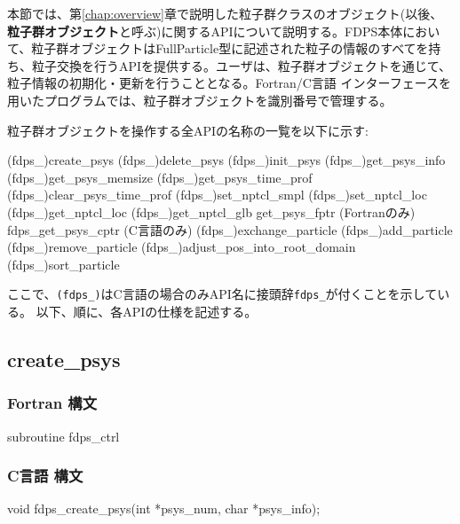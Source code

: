 本節では、第\ref{chap:overview}章で説明した粒子群クラスのオブジェクト(以後、\textbf{粒子群オブジェクト}と呼ぶ)に関するAPIについて説明する。FDPS本体において、粒子群オブジェクトはFullParticle型に記述された粒子の情報のすべてを持ち、粒子交換を行うAPIを提供する。ユーザは、粒子群オブジェクトを通じて、粒子情報の初期化・更新を行うこととなる。Fortran/C言語 インターフェースを用いたプログラムでは、粒子群オブジェクトを識別番号で管理する。

粒子群オブジェクトを操作する全APIの名称の一覧を以下に示す:
\begin{screen}
\begin{spverbatim}
(fdps_)create_psys
(fdps_)delete_psys
(fdps_)init_psys
(fdps_)get_psys_info
(fdps_)get_psys_memsize
(fdps_)get_psys_time_prof
(fdps_)clear_psys_time_prof
(fdps_)set_nptcl_smpl
(fdps_)set_nptcl_loc
(fdps_)get_nptcl_loc
(fdps_)get_nptcl_glb
get_psys_fptr (Fortranのみ)
fdps_get_psys_cptr (C言語のみ)
(fdps_)exchange_particle
(fdps_)add_particle 
(fdps_)remove_particle
(fdps_)adjust_pos_into_root_domain
(fdps_)sort_particle
\end{spverbatim}
\end{screen}
ここで、\texttt{(fdps\_)}はC言語の場合のみAPI名に接頭辞\texttt{fdps\_}が付くことを示している。
以下、順に、各APIの仕様を記述する。
\clearpage

\subsection{create\_psys}
\subsubsection*{Fortran 構文}
\begin{screen}
\begin{spverbatim}
subroutine fdps_ctrl%
\end{spverbatim}
\end{screen}

\subsubsection*{C言語 構文}
\begin{screen}
\begin{spverbatim}
void fdps_create_psys(int *psys_num,
                      char *psys_info);
\end{spverbatim}
\end{screen}

